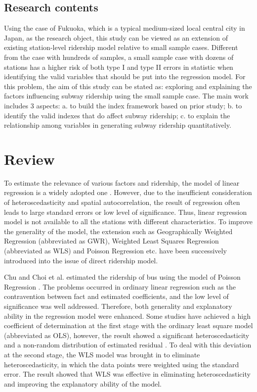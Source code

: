 \subsection{Research contents}
%
Using the case of Fukuoka, which is a typical medium-sized local central city in Japan, as the research object, this study can be viewed as an extension of existing station-level ridership model relative to small sample cases. Different from the case with hundreds of samples, a small sample case with dozens of stations has a higher risk of both type I and type II errors in statistic when identifying the valid variables that should be put into the regression model. For this problem, the aim of this study can be stated as: exploring and explaining the factors influencing subway ridership using the small sample case. The main work includes 3 aspects: a. to build the index framework based on prior study; b. to identify the valid indexes that do affect subway ridership; c. to explain the relationship among variables in generating subway ridership quantitatively.

\section{Review}
To estimate the relevance of various factors and ridership, the model of linear regression is a widely adopted one \cite{cervero1997travel,chakraborty2013land}. However, due to the insufficient consideration of heteroscedasticity and spatial autocorrelation, the result of regression often leads to large standard errors or low level of significance. Thus, linear regression model is not available to all the stations with different characteristics. To improve the generality of the model, the extension such as Geographically Weighted Regression (abbreviated as GWR), Weighted Least Squares Regression (abbreviated as WLS) and Poisson Regression etc. have been successively introduced into the issue of direct ridership model. 

Chu and Choi et al. estimated the ridership of bus using the model of Poisson Regression \cite{choi2012analysis,chu2004ridership}. The problems occurred in ordinary linear regression such as the contravention between fact and estimated coefficients, and the low level of significance was well addressed. Therefore, both generality and explanatory ability in the regression model were enhanced. Some studies have achieved a high coefficient of determination at the first stage with the ordinary least square model (abbreviated as OLS), however, the result showed a significant heteroscedasticity and a non-random distribution of estimated residual \cite{kuby2004factors}. To deal with this deviation at the second stage, the WLS model was brought in to eliminate heteroscedasticity, in which the data points were weighted using the standard error. The result showed that WLS was effective in eliminating heteroscedasticity and improving the explanatory ability of the model.

